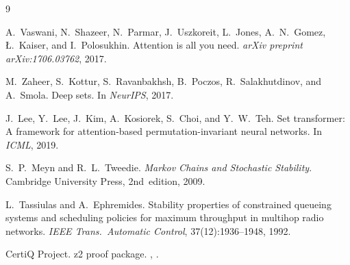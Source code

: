 \documentclass[a4paper,11pt]{article}
\theoremstyle{definition}
\begin{document}
\begin{thebibliography}{9}

A.~Vaswani, N.~Shazeer, N.~Parmar, J.~Uszkoreit, L.~Jones, A.~N.~Gomez,
\L.~Kaiser, and I.~Polosukhin.
\newblock Attention is all you need.
\newblock \textit{arXiv preprint arXiv:1706.03762}, 2017.

M.~Zaheer, S.~Kottur, S.~Ravanbakhsh, B.~Poczos, R.~Salakhutdinov,
and A.~Smola.
\newblock Deep sets.
\newblock In \textit{NeurIPS}, 2017.

J.~Lee, Y.~Lee, J.~Kim, A.~Kosiorek, S.~Choi, and Y.~W.~Teh.
\newblock Set transformer: A framework for attention-based
permutation-invariant neural networks.
\newblock In \textit{ICML}, 2019.

S.~P.~Meyn and R.~L.~Tweedie.
\newblock \textit{Markov Chains and Stochastic Stability}.
\newblock Cambridge University Press, 2nd~edition, 2009.

L.~Tassiulas and A.~Ephremides.
\newblock Stability properties of constrained queueing systems and scheduling
policies for maximum throughput in multihop radio networks.
\newblock \textit{IEEE Trans.~Automatic Control}, 37(12):1936--1948, 1992.

CertiQ Project.
\newblock z2 proof package.
\newblock {},
.

\end{thebibliography}
\end{document}
